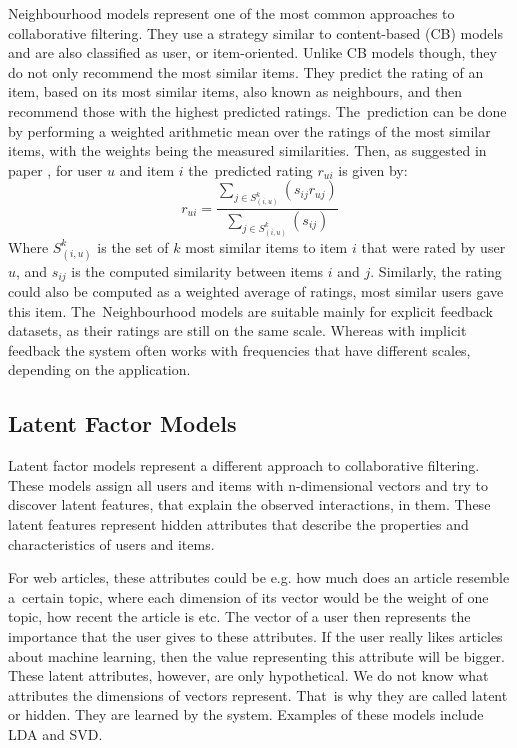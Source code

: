 Neighbourhood models represent one of the most common approaches to collaborative filtering. They use a strategy similar to content-based (CB) models and are also classified as user, or item-oriented. Unlike CB models though, they do not only recommend the most similar items. They predict the rating of an item, based on its most similar items, also known as neighbours, and then recommend those with the highest predicted ratings. The~prediction can be done by performing a weighted arithmetic mean over the ratings of the most similar items, with the weights being the measured similarities. Then, as suggested in paper \cite{Implicit}, for user $u$ and item $i$ the~predicted rating $r_{ui}$ is given by:
\begin{equation}
    r_{ui} = \frac{\sum_{j \in S^k_{(i,u)}}(s_{ij}r_{uj})}{\sum_{j \in S^k_{(i,u)}} (s_{ij})}
\end{equation}
Where $S^k_{(i,u)}$ is the set of $k$ most similar items to item $i$ that were rated by user $u$, and $s_{ij}$ is the computed similarity between items $i$ and $j$. Similarly, the rating could also be computed as a weighted average of ratings, most similar users gave this item. The~Neighbourhood models are suitable mainly for explicit feedback datasets, as their ratings are still on the same scale. Whereas with implicit feedback the system often works with frequencies that have different scales, depending on the application.


\subsection{Latent Factor Models} \label{latent_factor_models}

Latent factor models represent a different approach to collaborative filtering. These models assign all users and items with n-dimensional vectors and try to discover latent features, that explain the observed interactions, in them. These latent features represent hidden attributes that describe the properties and characteristics of users and items. 

For web articles, these attributes could be e.g. how much does an article resemble a~certain topic, where each dimension of its vector would be the weight of one topic, how recent the article is etc. The vector of a user then represents the importance that the user gives to these attributes. If the user really likes articles about machine learning, then the value representing this attribute will be bigger. These latent attributes, however, are only hypothetical. We do not know what attributes the dimensions of vectors represent. That~is why they are called latent or hidden. They are learned by the system. Examples of these models include LDA and SVD. 

